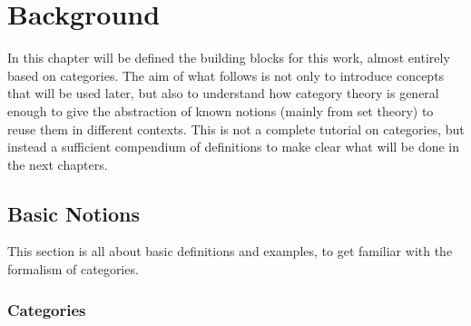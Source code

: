 \documentclass[a4paper, twoside,openright]{report}
\theoremstyle{plain}
\theoremstyle{definition}
\begin{document}
\newcommand{\cat}[1]{\mathscr{#1}}
\newcommand{\Ob}{\mathcal{O}b}
\newcommand{\Hom}{\mathcal{H}om}
\newcommand{\Set}{\mathbf{Set}}
\newcommand{\initial}{\textbf 0}
\newcommand{\terminal}{\mathds{1}}

% 

\tableofcontents


\chapter{Background}

In this chapter will be defined the building blocks for this work, almost entirely based on categories.
The aim of what follows is not only to introduce concepts that will be used later, but also to understand how category theory is general enough to give the abstraction of known notions (mainly from set theory) to reuse them in different contexts. This is not a complete tutorial on categories, but instead a sufficient compendium of definitions to make clear what will be done in the next chapters.

\section{Basic Notions}


This section is all about basic definitions and examples, to get familiar with the formalism of categories.

\subsection{Categories}
\end{document}

